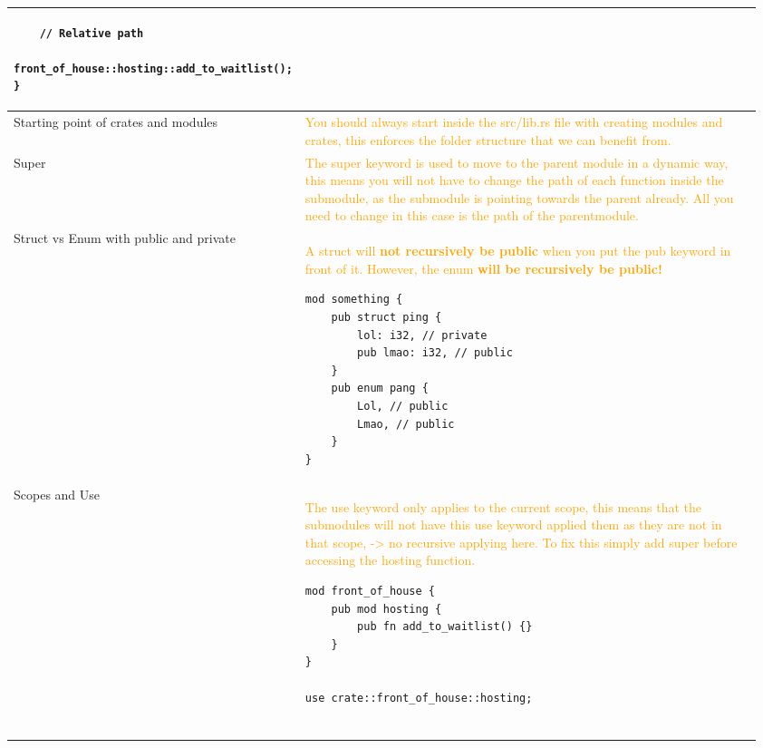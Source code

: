 \documentclass[main.tex,fontsize=8pt,paper=a4,paper=portrait,DIV=calc,]{scrartcl}
\begin{document}
\begin{table}[ht!]
\begin{tabular}{|m{0.2\linewidth}|m{0.755\linewidth}|}
\begin{lstlisting}
    // Relative path
    front_of_house::hosting::add_to_waitlist();
}
\end{lstlisting}
\\
\hline
Starting point of crates and modules & 
\textcolor{orange}{You should always start inside the src/lib.rs file with creating modules and crates, this enforces the folder structure that we can benefit from.}\\
\hline
Super & 
\textcolor{orange}{The super keyword is used to move to the parent module in a dynamic way, this means you will not have to change the path of each function inside the submodule, as the submodule is pointing towards the parent already.\newline
All you need to change in this case is the path of the parentmodule.}\\
\hline
Struct vs Enum with public and private & 
\textcolor{orange}{A struct will \textbf{not recursively be public} when you put the pub keyword in front of it.}\newline
\textcolor{orange}{However, the enum \textbf{will be recursively be public!}}\newline
\begin{lstlisting}
mod something {
    pub struct ping {
        lol: i32, // private
        pub lmao: i32, // public
    }
    pub enum pang {
        Lol, // public
        Lmao, // public
    }
}
\end{lstlisting}\\
\hline
Scopes and Use & 
\textcolor{orange}{The use keyword only applies to the current scope, this means that the submodules will not have this use keyword applied them as they are not in that scope, -> no recursive applying here.\newline
To fix this simply add super before accessing the hosting function.}\newline
\begin{lstlisting}
mod front_of_house {
    pub mod hosting {
        pub fn add_to_waitlist() {}
    }
}

use crate::front_of_house::hosting;


\end{lstlisting}
\end{tabular}
\end{table}
\end{document}
